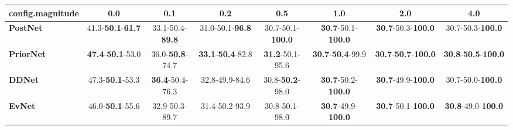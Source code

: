 \begin{tabular}{lccccccc}
\toprule
\textbf{config.magnitude} &                               0.0 &                      0.1 &                               0.2 &                       0.5 &                                1.0 &                                         2.0 &                                         4.0 \\
\midrule
\textbf{PostNet } &  41.3-\textbf{50.1}-\textbf{61.7} &  33.1-50.4-\textbf{89.8} &           31.0-50.1-\textbf{96.8} &  30.7-50.1-\textbf{100.0} &  \textbf{30.7}-50.1-\textbf{100.0} &           \textbf{30.7}-50.3-\textbf{100.0} &                    30.7-50.3-\textbf{100.0} \\
\textbf{PriorNet} &  \textbf{47.4}-\textbf{50.1}-53.0 &  36.0-\textbf{50.8}-74.7 &  \textbf{33.1}-\textbf{50.4}-82.8 &   \textbf{31.2}-50.1-95.6 &   \textbf{30.7}-\textbf{50.4}-99.9 &  \textbf{30.7}-\textbf{50.7}-\textbf{100.0} &  \textbf{30.8}-\textbf{50.5}-\textbf{100.0} \\
\textbf{DDNet   } &           47.3-\textbf{50.1}-53.3 &  \textbf{36.4}-50.4-76.3 &                    32.8-49.9-84.6 &   30.8-\textbf{50.2}-98.0 &  \textbf{30.7}-50.2-\textbf{100.0} &           \textbf{30.7}-49.9-\textbf{100.0} &                    30.7-50.0-\textbf{100.0} \\
\textbf{EvNet   } &           46.0-\textbf{50.1}-55.6 &           32.9-50.3-89.7 &                    31.4-50.2-93.9 &            30.8-50.1-98.0 &  \textbf{30.7}-49.9-\textbf{100.0} &           \textbf{30.7}-50.1-\textbf{100.0} &           \textbf{30.8}-49.0-\textbf{100.0} \\
\bottomrule
\end{tabular}
